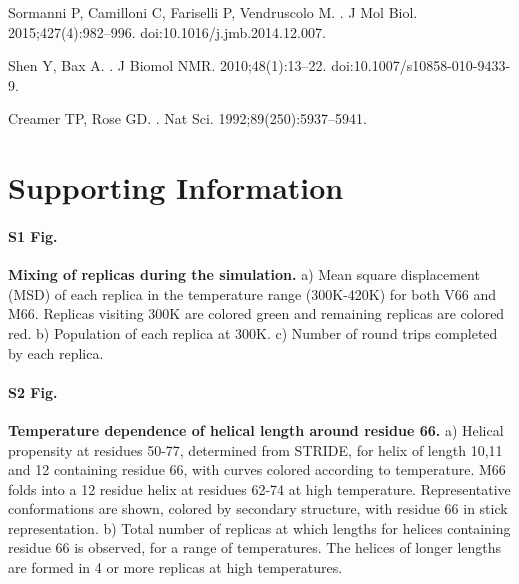 \documentclass[10pt,letterpaper]{article}
\begin{document}
\begin{thebibliography}{10}
Sormanni P, Camilloni C, Fariselli P, Vendruscolo M.
.
\newblock J Mol Biol. 2015;427(4):982--996.
\newblock doi:{10.1016/j.jmb.2014.12.007}.

Shen Y, Bax A.
.
\newblock J Biomol NMR. 2010;48(1):13--22.
\newblock doi:{10.1007/s10858-010-9433-9}.

Creamer TP, Rose GD.
.
\newblock Nat Sci. 1992;89(250):5937--5941.

\end{thebibliography}


%

\section*{Supporting Information}

\paragraph*{S1 Fig.}
\label{S1_Fig}
{\bf Mixing of replicas during the simulation.}
a) Mean square displacement (MSD) of each replica in the temperature range (300K-420K) for both V66 and M66. Replicas visiting 300K are colored green and remaining replicas are colored red. b) Population of each replica at 300K. c) Number of round trips completed by each replica.

\paragraph*{S2 Fig.}
\label{S2_Fig} 
{\bf Temperature dependence of helical length around residue 66. }
a) Helical propensity at residues 50-77, determined from STRIDE, for helix of length 10,11 and 12 containing residue 66, with curves colored according to temperature. M66 folds into a 12 residue helix at residues 62-74 at high temperature. Representative conformations are shown, colored by secondary structure, with residue 66 in stick representation. b) Total number of replicas at which lengths for helices containing residue 66 is observed, for a range of temperatures. The helices of longer lengths are formed in 4 or more replicas at high temperatures. 
\end{document}
